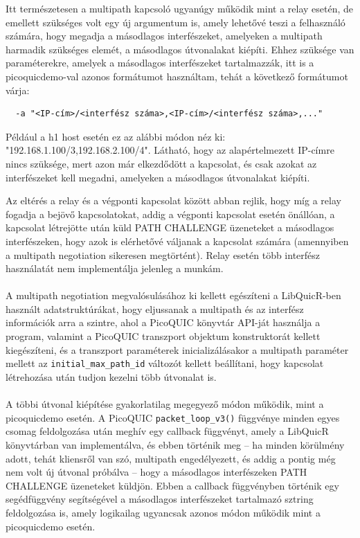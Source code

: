 \documentclass[a4paper,oneside]{article}
\begin{document}
Itt természetesen a multipath kapcsoló ugyanúgy működik mint a relay esetén,
de emellett szükséges volt egy új argumentum is, amely lehetővé teszi a felhasználó számára, hogy megadja a másodlagos interfészeket,
amelyeken a multipath harmadik szükséges elemét, a másodlagos útvonalakat kiépíti. Ehhez szüksége van paraméterekre, amelyek a másodlagos interfészeket
tartalmazzák, itt is a picoquicdemo-val azonos formátumot használtam, tehát a következő formátumot várja:
\begin{verbatim}
  -a "<IP-cím>/<interfész száma>,<IP-cím>/<interfész száma>,..."
\end{verbatim}
Például a h1 host esetén ez az alábbi módon néz ki: "192.168.1.100/3,192.168.2.100/4". Látható, hogy az alapértelmezett IP-címre nincs 
szüksége, mert azon már elkezdődött a kapcsolat, és csak azokat az interfészeket kell megadni, amelyeken a másodlagos útvonalakat kiépíti. 

Az eltérés a relay és a végponti kapcsolat között abban rejlik, hogy míg a relay fogadja a bejövő kapcsolatokat, addig a végponti kapcsolat esetén önállóan,
a kapcsolat létrejötte után küld PATH CHALLENGE üzeneteket a másodlagos interfészeken, 
hogy azok is elérhetővé váljanak a kapcsolat számára (amennyiben a multipath negotiation sikeresen megtörtént).
Relay esetén több interfész használatát nem implementálja jelenleg a munkám.

\paragraph{}

A multipath negotiation megvalósulásához ki kellett egészíteni a LibQuicR-ben
használt adatstruktúrákat, hogy eljussanak a multipath és az interfész információk
arra a szintre, ahol a PicoQUIC könyvtár API-ját használja a program, valamint 
a PicoQUIC transzport objektum konstruktorát 
kellett kiegészíteni, és a transzport paraméterek inicializálásakor a multipath paraméter mellett az 
  \texttt{initial\_max\_path\_id}
változót kellett beállítani, hogy kapcsolat létrehozása után tudjon kezelni több útvonalat is.

\paragraph{}

A többi útvonal kiépítése gyakorlatilag megegyező módon működik, mint a picoquicdemo esetén. A PicoQUIC 
  \texttt{packet\_loop\_v3()}
függvénye minden egyes csomag feldolgozása után meghív egy callback függvényt, amely a LibQuicR könyvtárban van 
implementálva, és ebben történik meg – ha minden körülmény adott, tehát kliensről van szó, 
multipath engedélyezett, és addig a pontig még nem volt új útvonal próbálva – hogy a másodlagos interfészeken PATH CHALLENGE üzeneteket küldjön.
Ebben a callback függvényben történik egy segédfüggvény segítségével a másodlagos interfészeket tartalmazó sztring feldolgozása is, amely logikailag
ugyancsak azonos módon működik mint a picoquicdemo esetén.
\end{document}
